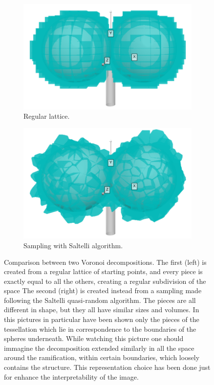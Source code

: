 \begin{description}
    \begin{figure}
        \centering
        \begin{subfigure}[b]{0.45\textwidth}
             \centering
             \includegraphics[width = \textwidth]{images/reg_vor}
             \caption{Regular lattice.}
             \label{fig:reg_vor}
        \end{subfigure}
        \hfill
        \begin{subfigure}[b]{0.45\textwidth}
             \centering
             \includegraphics[width = \textwidth]{images/sal_vor}
             \caption{Sampling with Saltelli algorithm.}
             \label{fig:sal_vor}
        \end{subfigure}
        \caption{Comparison between two Voronoi decompositions. The first (left) is created from a regular lattice of starting points, and every piece is exactly equal to all the others, creating a regular subdivision of the space The second (right) is created instead from a sampling made following the Saltelli quasi-random algorithm. The pieces are all different in shape, but they all have similar sizes and volumes. In this pictures in particular have been shown only the pieces of the tessellation which lie in correspondence to the boundaries of the spheres underneath. While watching this picture one should immagine the decomposition extended similarly in all the space around the ramification, within certain boundaries, which loosely contains the structure. This representation choice has been done just for enhance the interpretability of the image. }
        \label{fig:vor_comp}
    \end{figure}


\end{description}

